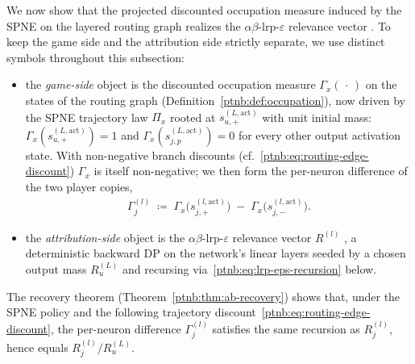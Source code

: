 We now show that the projected discounted occupation measure induced by the SPNE on the layered
routing graph realizes the $\alpha\beta$-\ac{lrp}-$\varepsilon$ relevance vector
. To keep
the game side and the attribution side strictly separate, we use distinct symbols throughout this
subsection:
\begin{itemize}
    \item the \emph{game-side} object is the discounted occupation measure $\Gamma_x(\,\cdot\,)$ on the
        states of the routing graph (Definition~\ref{ptnb:def:occupation}), now driven by the SPNE trajectory
        law $\Pi_x$ rooted at $s_{u,+}^{(L,\mathrm{act})}$ with unit initial mass:
        $\Gamma_x(s_{u,+}^{(L,\mathrm{act})}) = 1$ and $\Gamma_x(s_{j,p}^{(L,\mathrm{act})}) = 0$ for every
        other output activation state. With non-negative branch discounts
        (cf.~\eqref{ptnb:eq:routing-edge-discount}) $\Gamma_x$ is itself non-negative; we then form the
        per-neuron difference of the two player copies,
        \begin{align}\label{ptnb:eq:routing-Gamma-pair}
            \Gamma^{(l)}_j \;\coloneqq\;
            \Gamma_x\!\bigl(s_{j,+}^{(l,\mathrm{act})}\bigr)
            \;-\;
            \Gamma_x\!\bigl(s_{j,-}^{(l,\mathrm{act})}\bigr).
        \end{align}
    \item the \emph{attribution-side} object is the $\alpha\beta$-\ac{lrp}-$\varepsilon$ relevance
        vector $R^{(l)}$ , a deterministic backward DP on the network's linear layers
        seeded by a chosen output mass $R_u^{(L)}$ and recursing via~\eqref{ptnb:eq:lrp-eps-recursion} below.
\end{itemize}
The recovery theorem (Theorem~\ref{ptnb:thm:ab-recovery}) shows that, under the SPNE policy and the
following trajectory discount~\eqref{ptnb:eq:routing-edge-discount}, the per-neuron difference
$\Gamma^{(l)}_j$ satisfies the same recursion as $R^{(l)}_j$, hence equals $R^{(l)}_j/R^{(L)}_u$.

